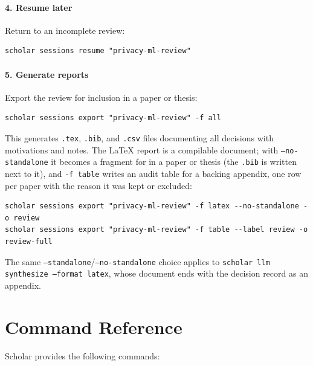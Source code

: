 \paragraph{4. Resume later}
Return to an incomplete review:
\begin{verbatim}
scholar sessions resume "privacy-ml-review"
\end{verbatim}

\paragraph{5. Generate reports}
Export the review for inclusion in a paper or thesis:
\begin{verbatim}
scholar sessions export "privacy-ml-review" -f all
\end{verbatim}
This generates \texttt{.tex}, \texttt{.bib}, and \texttt{.csv} files 
documenting all decisions with motivations and notes.
The \LaTeX{} report is a compilable document; with
\texttt{--no-standalone} it becomes a fragment for \verb|| in a
paper or thesis (the \texttt{.bib} is written next to it), and
\texttt{-f table} writes an audit table for a backing appendix, one row
per paper with the reason it was kept or excluded:
\begin{verbatim}
scholar sessions export "privacy-ml-review" -f latex --no-standalone -o review
scholar sessions export "privacy-ml-review" -f table --label review -o review-full
\end{verbatim}
The same \texttt{--standalone}/\texttt{--no-standalone} choice applies to
\texttt{scholar llm synthesize --format latex}, whose document ends with
the decision record as an appendix.


\section{Command Reference}

Scholar provides the following commands:

